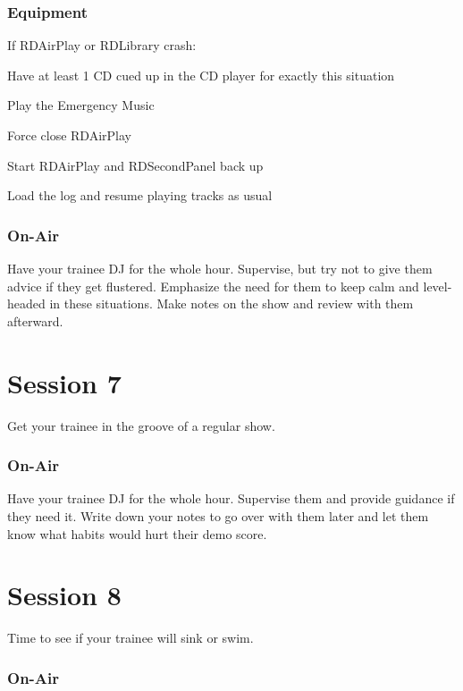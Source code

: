 \documentclass{witrman}
\begin{document}
\subsection{Equipment}

If RDAirPlay or RDLibrary crash:
\begin{skinnyenumerate}
    \item Have at least 1 CD cued up in the CD player for exactly this situation
    \item Play the Emergency Music
    \item Force close RDAirPlay
    \item Start RDAirPlay and RDSecondPanel back up
    \item Load the log and resume playing tracks as usual
\end{skinnyenumerate}

\subsection{On-Air}

Have your trainee DJ for the whole hour.  Supervise, but try not to give them
advice if they get flustered.  Emphasize the need for them to keep calm and
level-headed in these situations.  Make notes on the show and review with them
afterward.


\chapter{Session 7}

Get your trainee in the groove of a regular show.

\subsection{On-Air}

Have your trainee DJ for the whole hour.  Supervise them and provide guidance if
they need it.  Write down your notes to go over with them later and let them
know what habits would hurt their demo score.


\chapter{Session 8}

Time to see if your trainee will sink or swim.

\subsection{On-Air}
\end{document}
